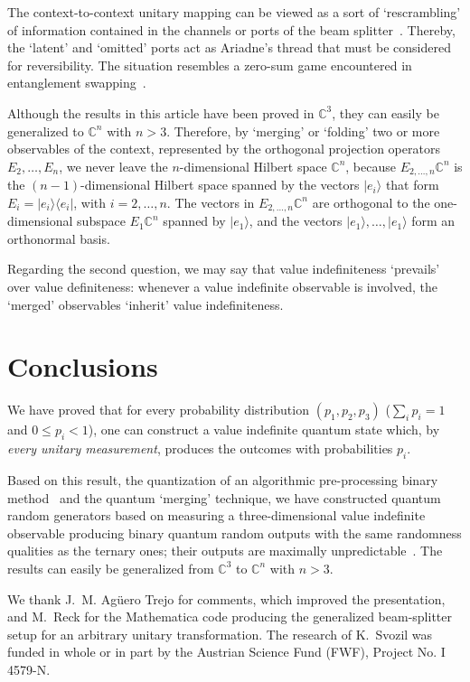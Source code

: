 \documentclass[%
 superscriptaddress,
  preprint,
 showpacs,
 showkeys,
 nofootinbib,
  amsmath,amssymb,
 pra,
  longbibliography,
  floatfix,
 ]{revtex4-2}
\theoremstyle{definition}
\newcommand{\C}{\mathbb{C}}
\begin{document}
The context-to-context unitary mapping can be viewed as a sort of `rescrambling'
of information contained in the channels or ports of the beam splitter~\cite{schrodinger-gwsidqm2,zeil-99}.
Thereby, the `latent' and `omitted' ports act as Ariadne's thread that must be considered for reversibility.
The situation resembles a zero-sum game encountered in
entanglement swapping~\cite{BBCJPW,peres-DelayedChoiceEntanglementSwapping}.


Although the results in this article have been proved in  $\C^3$, they can easily be generalized to $\C^n$ with $ n>3$.
Therefore, by `merging'
or `folding'
two or more observables of the context, represented by the orthogonal projection operators $E_2,\ldots , E_n$,
we never leave the $n$-dimensional Hilbert space $\C^n$,
because $E_{2,\ldots,n}\C^n$ is the $(n-1)$-dimensional Hilbert space spanned by the vectors
$\vert e_i\rangle$ that form
$E_i=\vert e_i\rangle \langle e_i \vert$, with $i=2,\ldots, n$.
The vectors in $E_{2,\ldots,n}\C^n$ are orthogonal to the one-dimensional subspace $E_{1}\C^n$ spanned by $\vert e_1\rangle$,
and the vectors $\vert e_1\rangle,\ldots ,\vert e_1\rangle$ form an orthonormal basis.

Regarding the second question, we may say that value indefiniteness `prevails' over value definiteness: whenever a value indefinite observable is involved, the `merged' observables `inherit' value indefiniteness.


\section{Conclusions}


We have proved that
for every probability distribution $(p_1,p_2,p_3)$ ($\sum_{i}p_i=1$ and $0\le  p_i < 1$), one can construct a value indefinite quantum state which, by {\it every unitary  measurement}, produces the
outcomes with probabilities $p_i$.


Based on this result, the quantization of an algorithmic pre-processing binary method~\cite{CALUDE202131} and the quantum `merging' technique, we have constructed quantum random generators based on measuring a three-dimensional value indefinite observable producing binary quantum random outputs with the same randomness qualities as the ternary ones; their outputs are maximally unpredictable~\cite{2014-nobit}. The results can easily be generalized from $\C^3$ to $\C^n$ with $ n>3$.


\begin{acknowledgments}
We thank J.~M. Ag\"{u}ero Trejo for comments, which improved the presentation, and M.~Reck for the Mathematica code producing the generalized beam-splitter setup for an arbitrary unitary transformation.
The research of K.~Svozil was funded in whole or in part by the Austrian Science Fund (FWF), Project No. I 4579-N.
\end{acknowledgments}




\end{document}

